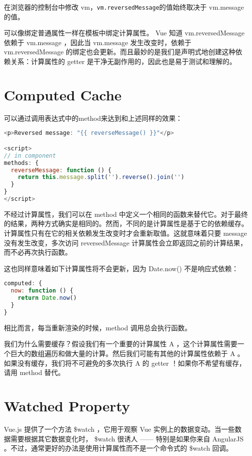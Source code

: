 在浏览器的控制台中修改 vm，\texttt{vm.reversedMessage}的值始终取决于 vm.message 的值。


可以像绑定普通属性一样在模板中绑定计算属性。 Vue 知道 vm.reversedMessage 依赖于 vm.message ，因此当 vm.message 发生改变时，依赖于 vm.reversedMessage 的绑定也会更新。而且最妙的是我们是声明式地创建这种依赖关系：计算属性的 getter 是干净无副作用的，因此也是易于测试和理解的。


\section{Computed Cache}

可以通过调用表达式中的method来达到和上述同样的效果：


\begin{lstlisting}[language=JavaScript]
<p>Reversed message: "{{ reverseMessage() }}"</p>

<script>
// in component
methods: {
  reverseMessage: function () {
    return this.message.split('').reverse().join('')
  }
}
</script>
\end{lstlisting}

不经过计算属性，我们可以在 method 中定义一个相同的函数来替代它。对于最终的结果，两种方式确实是相同的。然而，不同的是计算属性是基于它的依赖缓存。计算属性只有在它的相关依赖发生改变时才会重新取值。这就意味着只要 message 没有发生改变，多次访问 reversedMessage 计算属性会立即返回之前的计算结果，而不必再次执行函数。

这也同样意味着如下计算属性将不会更新，因为 Date.now() 不是响应式依赖：

\begin{lstlisting}[language=JavaScript]
computed: {
  now: function () {
    return Date.now()
  }
}
\end{lstlisting}

相比而言，每当重新渲染的时候，method 调用总会执行函数。

我们为什么需要缓存？假设我们有一个重要的计算属性 A ，这个计算属性需要一个巨大的数组遍历和做大量的计算。然后我们可能有其他的计算属性依赖于 A 。如果没有缓存，我们将不可避免的多次执行 A 的 getter ！如果你不希望有缓存，请用 method 替代。

\section{Watched Property}

Vue.js 提供了一个方法 \$watch ，它用于观察 Vue 实例上的数据变动。当一些数据需要根据其它数据变化时， \$watch 很诱人 —— 特别是如果你来自 AngularJS 。不过，通常更好的办法是使用计算属性而不是一个命令式的 \$watch 回调。


